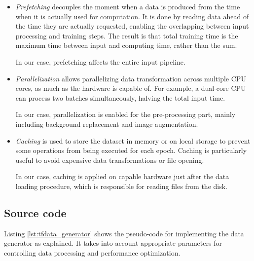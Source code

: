 \begin{itemize}
    \item \textit{Prefetching} decouples the moment when a data is produced from the time when it is actually used for computation. It is done by reading data ahead of the time they are actually requested, enabling the overlapping between input processing and training steps. The result is that total training time is the maximum time between input and computing time, rather than the sum.
    
    In our case, prefetching affects the entire input pipeline.
    
    \item \textit{Parallelization} allows parallelizing data transformation across multiple CPU cores, as much as the hardware is capable of. For example, a dual-core CPU can process two batches simultaneously, halving the total input time. 
    
    In our case, parallelization is enabled for the pre-processing part, mainly including background replacement and image augmentation.
    
    \item \textit{Caching} is used to store the dataset in memory or on local storage to prevent some operations from being executed for each epoch. Caching is particularly useful to avoid expensive data transformations or file opening.
    
    In our case, caching is applied on capable hardware just after the data loading procedure, which is responsible for reading files from the disk.
\end{itemize}



\subsection{Source code}
\label{subsec:data-generator-code}

Listing \ref{lst:tfdata_generator} shows the pseudo-code for implementing the data generator as explained. It takes into account appropriate parameters for controlling data processing and performance optimization.

